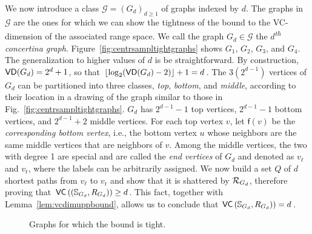 We now introduce a class $\mathcal{G}=(G_d)_{d\ge 1}$ of graphs indexed by $d$.
The graphs in $\mathcal{G}$ are the ones for which we can show the tightness of
the bound to the VC-dimension of the associated range space.
We call the graph $G_d\in\mathcal{G}$ the \emph{$d$\textsuperscript{th} concertina graph}.
Figure~\ref{fig:centrsampltightgraphs} shows $G_1$, $G_2$, $G_3$, and $G_4$. The
generalization to higher values of $d$ is be straightforward.
By construction, $\mathsf{VD}(G_d)=2^d+1$, so that
$\lfloor\log_2(\mathsf{VD}(G_d)-2)\rfloor+1=d$. The $3(2^{d-1})$ vertices of $G_d$ can
be partitioned into three classes, \emph{top}, \emph{bottom}, and \emph{middle},
according to their location in a drawing of the graph similar to those in
Fig.~\ref{fig:centrsampltightgraphs}. $G_d$ has $2^{d-1}-1$ top vertices, $2^{d-1}-1$ bottom vertices, and
$2^{d-1}+2$ middle vertices. For each top vertex $v$, let $\mathsf{f}(v)$ be the
\emph{corresponding bottom vertex}, i.e., the bottom vertex $u$ whose neighbors
are the same middle vertices that are neighbors of $v$. Among the middle
vertices, the two with degree 1 are special and are called the \emph{end
vertices} of $G_d$ and denoted as $v_\ell$ and $v_\mathrm{r}$, where the
labels can be arbitrarily assigned. We now build a set $Q$ of $d$
shortest paths from $v_\ell$ to $v_\mathrm{r}$ and show that it is
shattered by $\mathcal{R}_{G_d}$, therefore proving that
$\mathsf{VC}\left((\mathbb{S}_{G_d},R_{G_d})\right)\ge d$.
This fact, together with Lemma~\ref{lem:vcdimuppbound}, allows us to conclude
that $\mathsf{VC}\left(\mathbb{S}_{G_d},R_{G_d})\right)=d$. 

\begin{figure}[htbp]
  \centering
  \hfill
  \hfill
  \caption{Graphs for which the bound is tight.}
\end{figure}

